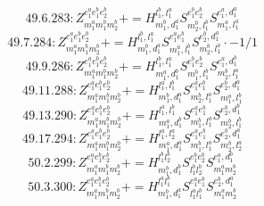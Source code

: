 \documentclass[letterpaper,10pt,fleqn,leqno,onecolumn]{article}
\begin{document}
\begin{equation} \;\;\;\;\;\;  49.6.283: Z^{e_{1}^{a}e_{1}^{b}e_{2}^{b}}_{m_{1}^{a}m_{1}^{b}m_{2}^{b}}+=H^{l_{1}^{b},l_{1}^{a}}_{m_{1}^{b},d_{1}^{a}}S^{e_{1}^{b}e_{2}^{b}}_{m_{2}^{b},l_{1}^{b}}S^{e_{1}^{a},d_{1}^{a}}_{m_{1}^{a},l_{1}^{a}} \end{equation}
\begin{equation} \;\;\;\;\;\;  49.7.284: Z^{e_{1}^{a}e_{1}^{b}e_{2}^{b}}_{m_{1}^{a}m_{1}^{b}m_{2}^{b}}+=H^{l_{1}^{b},l_{1}^{a}}_{m_{1}^{b},d_{1}^{a}}S^{e_{1}^{a}e_{1}^{b}}_{m_{1}^{a},l_{1}^{b}}S^{e_{2}^{b},d_{1}^{a}}_{m_{2}^{b},l_{1}^{a}}\cdot -1/1 \end{equation}
\begin{equation} \;\;\;\;\;\;  49.9.286: Z^{e_{1}^{a}e_{1}^{b}e_{2}^{b}}_{m_{1}^{a}m_{1}^{b}m_{2}^{b}}+=H^{l_{1}^{b},l_{1}^{a}}_{m_{1}^{a},d_{1}^{b}}S^{e_{1}^{b}e_{2}^{b}}_{m_{1}^{b},l_{1}^{b}}S^{e_{1}^{a},d_{1}^{b}}_{m_{2}^{b},l_{1}^{a}} \end{equation}
\begin{equation} \;\;\;\;\;\;  49.11.288: Z^{e_{1}^{a}e_{1}^{b}e_{2}^{b}}_{m_{1}^{a}m_{1}^{b}m_{2}^{b}}+=H^{l_{1}^{a},l_{1}^{b}}_{m_{1}^{b},d_{1}^{a}}S^{e_{1}^{a}e_{1}^{b}}_{m_{2}^{b},l_{1}^{a}}S^{e_{2}^{b},d_{1}^{a}}_{m_{1}^{a},l_{1}^{b}} \end{equation}
\begin{equation} \;\;\;\;\;\;  49.13.290: Z^{e_{1}^{a}e_{1}^{b}e_{2}^{b}}_{m_{1}^{a}m_{1}^{b}m_{2}^{b}}+=H^{l_{1}^{a},l_{1}^{b}}_{m_{1}^{a},d_{1}^{b}}S^{e_{1}^{a}e_{1}^{b}}_{m_{1}^{b},l_{1}^{a}}S^{e_{2}^{b},d_{1}^{b}}_{m_{2}^{b},l_{1}^{b}} \end{equation}
\begin{equation} \;\;\;\;\;\;  49.17.294: Z^{e_{1}^{a}e_{1}^{b}e_{2}^{b}}_{m_{1}^{a}m_{1}^{b}m_{2}^{b}}+=H^{l_{1}^{a},l_{2}^{a}}_{m_{1}^{a},d_{1}^{a}}S^{e_{1}^{a}e_{1}^{b}}_{m_{1}^{b},l_{1}^{a}}S^{e_{2}^{b},d_{1}^{a}}_{m_{2}^{b},l_{2}^{a}} \end{equation}
\begin{equation} \;\;\;\;\;\;  50.2.299: Z^{e_{1}^{a}e_{1}^{b}e_{2}^{b}}_{m_{1}^{a}m_{1}^{b}m_{2}^{b}}+=H^{l_{1}^{b}l_{2}^{b}}_{m_{1}^{b},d_{1}^{b}}S^{e_{1}^{b}e_{2}^{b}}_{l_{1}^{b}l_{2}^{b}}S^{e_{1}^{a},d_{1}^{b}}_{m_{1}^{a}m_{2}^{b}} \end{equation}
\begin{equation} \;\;\;\;\;\;  50.3.300: Z^{e_{1}^{a}e_{1}^{b}e_{2}^{b}}_{m_{1}^{a}m_{1}^{b}m_{2}^{b}}+=H^{l_{1}^{a}l_{1}^{b}}_{m_{1}^{b},d_{1}^{a}}S^{e_{1}^{a}e_{1}^{b}}_{l_{1}^{a}l_{1}^{b}}S^{e_{2}^{b},d_{1}^{a}}_{m_{1}^{a}m_{2}^{b}} \end{equation}
\end{document}
